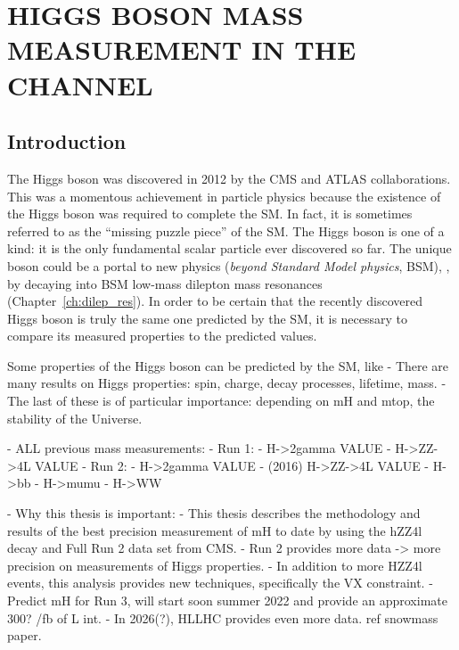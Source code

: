 \chapter{HIGGS BOSON MASS MEASUREMENT IN THE \texorpdfstring{\hzzfourl}{H to ZZ to 4l} CHANNEL}
\section{Introduction}
The Higgs boson was discovered in 2012 by the CMS and ATLAS collaborations.
This was a momentous achievement in particle physics because the existence of the Higgs boson was required to complete the SM.
In fact, it is sometimes referred to as the ``missing puzzle piece'' of the SM.
The Higgs boson is one of a kind: it is the only fundamental scalar particle ever discovered so far.
The unique boson could be a portal to new physics (\emph{beyond Standard Model physics}, BSM), \eg, by decaying into BSM low-mass dilepton mass resonances (Chapter~\ref{ch:dilep_res}).
In order to be certain that the recently discovered Higgs boson is truly the same one predicted by the SM, it is necessary to compare its measured properties to the predicted values.

Some properties of the Higgs boson can be predicted by the SM, like 
    - There are many results on Higgs properties: spin, charge, decay processes, lifetime, mass.
    - The last of these is of particular importance: depending on mH and mtop, the stability of the Universe.

- ALL previous mass measurements:
    - Run 1:
        - H->2gamma VALUE
        - H->ZZ->4L VALUE
    - Run 2:
        - H->2gamma VALUE
        - (2016) H->ZZ->4L VALUE
        - H->bb
        - H->mumu
        - H->WW 

- Why this thesis is important:
    - This thesis describes the methodology and results of the best precision measurement of mH to date by using the hZZ4l decay and Full Run 2 data set from CMS.
    - Run 2 provides more data -> more precision on measurements of Higgs properties.
    - In addition to more HZZ4l events, this analysis provides new techniques, specifically the VX constraint.
    - Predict mH for Run 3, will start soon summer 2022 and provide an approximate 300? /fb of L int.
    - In 2026(?), HLLHC provides even more data. ref snowmass paper.

